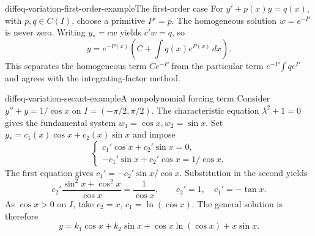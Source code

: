 \documentclass[preview]{standalone}
\begin{document}
\begin{snippetexample}{diffeq-variation-first-order-example}{The first-order case}
    For \(y'+p(x)y=q(x)\), with \(p,q\in C(I)\), choose a primitive \(P'=p\).
    The homogeneous solution \(w=e^{-P}\) is never zero.
    Writing \(y_*=cw\) yields \(c'w=q\), so
    \[
        y=e^{-P(x)}\left(C+\int q(x)e^{P(x)}\,dx\right).
    \]
    This separates the homogeneous term \(Ce^{-P}\) from the particular
    term \(e^{-P}\int qe^P\) and agrees with the integrating-factor method.
\end{snippetexample}

\begin{snippetexample}{diffeq-variation-secant-example}{A nonpolynomial forcing term}
    Consider \(y''+y=1/\cos x\) on \(I=(-\pi/2,\pi/2)\).
    The characteristic equation \(\lambda^2+1=0\) gives the fundamental
    system \(w_1=\cos x,w_2=\sin x\).
    Set \(y_*=c_1(x)\cos x+c_2(x)\sin x\) and impose
    \[
        \begin{cases}
        c_1'\cos x+c_2'\sin x=0,\\
        -c_1'\sin x+c_2'\cos x=1/\cos x.
        \end{cases}
    \]
    The first equation gives \(c_1'=-c_2'\sin x/\cos x\).
    Substitution in the second yields
    \[
        c_2'\frac{\sin^2x+\cos^2x}{\cos x}=\frac1{\cos x},
        \qquad c_2'=1,\quad c_1'=-\tan x.
    \]
    As \(\cos x>0\) on \(I\), take \(c_2=x\), \(c_1=\ln(\cos x)\).
    The general solution is therefore
    \[
        y=k_1\cos x+k_2\sin x+\cos x\ln(\cos x)+x\sin x.
    \]
\end{snippetexample}
\end{document}
